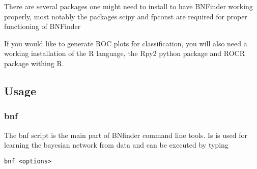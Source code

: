 There are several packages one might need to install to have BNFinder working properly, most notably the packages scipy and fpconst are required for proper functioning of BNFinder

If you would like to generate ROC plots for classification, you will also need a working installation of the R language, the Rpy2 python package and ROCR package withing R. 

\subsection{Usage}

\subsubsection{bnf}

The bnf script is the main part of BNfinder command line tools. Is is used for learning the bayesian network from data and can be executed by typing
\begin{verbatim}
bnf <options>
\end{verbatim}

